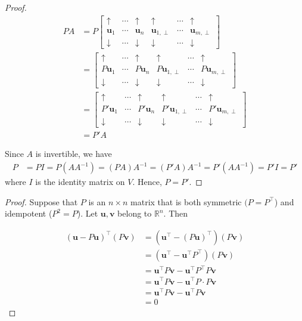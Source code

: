 \documentclass[12pt]{article}
\begin{document}
\begin{enumerate}
\begin{proof}
	\begin{align*}
		PA
		&=P\begin{bmatrix}
			\uparrow & \cdots & \uparrow & \uparrow & \cdots& \uparrow\\
			\mathbf{u}_1 & \cdots & \mathbf{u}_n & \mathbf{u}_{1,\perp} & \cdots & \mathbf{u}_{m, \perp}\\
			\downarrow & \cdots & \downarrow& \downarrow& \cdots& \downarrow
		\end{bmatrix}\\
		&=\begin{bmatrix}
			\uparrow & \cdots & \uparrow & \uparrow & \cdots& \uparrow\\
			P\mathbf{u}_1 & \cdots & P\mathbf{u}_n & P\mathbf{u}_{1,\perp} & \cdots & P\mathbf{u}_{m, \perp}\\
			\downarrow & \cdots & \downarrow& \downarrow& \cdots& \downarrow
		\end{bmatrix}\\
		&=\begin{bmatrix}
			\uparrow & \cdots & \uparrow & \uparrow & \cdots& \uparrow\\
			P'\mathbf{u}_1 & \cdots & P'\mathbf{u}_n & P'\mathbf{u}_{1,\perp} & \cdots & P'\mathbf{u}_{m, \perp}\\
			\downarrow & \cdots & \downarrow& \downarrow& \cdots& \downarrow
		\end{bmatrix}\\
		&=P'A
	\end{align*}
	
	Since $A$ is invertible, we have
	\begin{align*}
		P&=PI=P(AA^{-1})=(PA)A^{-1}=(P'A)A^{-1}=P'(AA^{-1})=P'I=P'
	\end{align*}
	where $I$ is the identity matrix on $V$. Hence, $P=P'$.
\end{proof}


\begin{proof}
	Suppose that $P$ is an $n\times n$ matrix that is both symmetric $(P=P^\top$)
	and idempotent ($P^2=P$). Let $\mathbf{u},\mathbf{v}$ belong to $\mathbb{R}^n$.
	Then
	
	\begin{align*}
		(\mathbf{u}-P\mathbf{u})^\top (P\mathbf{v})
		&=(\mathbf{u}^\top - (P\mathbf{u})^\top)(P\mathbf{v})\\
		&=(\mathbf{u}^\top -\mathbf{u}^\top P^\top)(P\mathbf{v})\\
		&=\mathbf{u}^\top P\mathbf{v}-\mathbf{u}^\top P^\top P\mathbf{v}\\
		&=\mathbf{u}^\top P\mathbf{v} - \mathbf{u}^\top P\cdot P\mathbf{v}
		\tag{Symmetry: $P=P^\top$}\\
		&=\mathbf{u}^\top P\mathbf{v}-\mathbf{u}^\top P\mathbf{v}
		\tag{Idempotency: $P^2=P$}\\
		&=0
	\end{align*}
	

\end{proof}
\end{enumerate}
\end{document}
